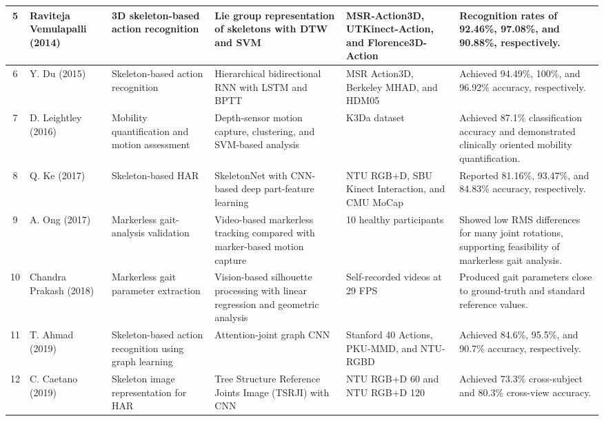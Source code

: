\documentclass[12pt]{elsarticle}
\begin{document}
{\begin{longtable}{c p{2.7cm} p{2.8cm} p{3.3cm} p{3.4cm} p{3.6cm}}
5 & Raviteja Vemulapalli \cite{vemulapalli2014human} (2014) & 3D skeleton-based action recognition & Lie group representation of skeletons with DTW and SVM & MSR-Action3D, UTKinect-Action, and Florence3D-Action & Recognition rates of 92.46\%, 97.08\%, and 90.88\%, respectively. \\
\hline

6 & Y. Du \cite{du2015hierarchical} (2015) & Skeleton-based action recognition & Hierarchical bidirectional RNN with LSTM and BPTT & MSR Action3D, Berkeley MHAD, and HDM05 & Achieved 94.49\%, 100\%, and 96.92\% accuracy, respectively. \\
\hline

7 & D. Leightley \cite{leightley2016automated} (2016) & Mobility quantification and motion assessment & Depth-sensor motion capture, clustering, and SVM-based analysis & K3Da dataset & Achieved 87.1\% classification accuracy and demonstrated clinically oriented mobility quantification. \\
\hline

8 & Q. Ke \cite{ke2017skeletonnet} (2017) & Skeleton-based HAR & SkeletonNet with CNN-based deep part-feature learning & NTU RGB+D, SBU Kinect Interaction, and CMU MoCap & Reported 81.16\%, 93.47\%, and 84.83\% accuracy, respectively. \\
\hline

9 & A. Ong \cite{ong2017efficacy} (2017) & Markerless gait-analysis validation & Video-based markerless tracking compared with marker-based motion capture & 10 healthy participants & Showed low RMS differences for many joint rotations, supporting feasibility of markerless gait analysis. \\
\hline

10 & Chandra Prakash \cite{prakash2018vision} (2018) & Markerless gait parameter extraction & Vision-based silhouette processing with linear regression and geometric analysis & Self-recorded videos at 29 FPS & Produced gait parameters close to ground-truth and standard reference values. \\
\hline

11 & T. Ahmad \cite{ahmad2019action} (2019) & Skeleton-based action recognition using graph learning & Attention-joint graph CNN & Stanford 40 Actions, PKU-MMD, and NTU-RGBD & Achieved 84.6\%, 95.5\%, and 90.7\% accuracy, respectively. \\
\hline

12 & C. Caetano \cite{caetano2019skeleton} (2019) & Skeleton image representation for HAR & Tree Structure Reference Joints Image (TSRJI) with CNN & NTU RGB+D 60 and NTU RGB+D 120 & Achieved 73.3\% cross-subject and 80.3\% cross-view accuracy. \\
\hline


\end{longtable}}
\end{document}

